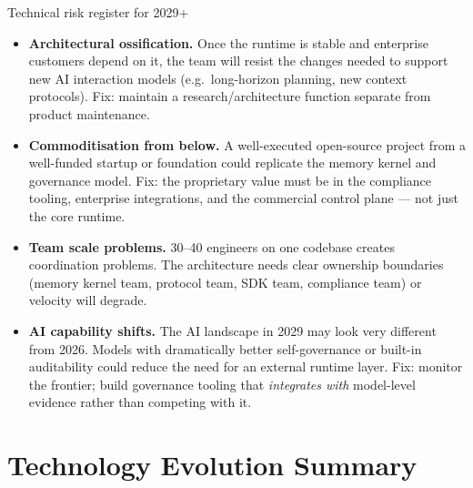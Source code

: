 \begin{warnbox}{Technical risk register for 2029+}
\begin{itemize}[noitemsep,leftmargin=1.4em]
  \item \textbf{Architectural ossification.} Once the runtime is stable and
        enterprise customers depend on it, the team will resist the changes
        needed to support new AI interaction models (e.g.\ long-horizon planning,
        new context protocols). Fix: maintain a research/architecture function
        separate from product maintenance.
  \item \textbf{Commoditisation from below.} A well-executed open-source
        project from a well-funded startup or foundation could replicate the
        memory kernel and governance model. Fix: the proprietary value must be
        in the compliance tooling, enterprise integrations, and the commercial
        control plane — not just the core runtime.
  \item \textbf{Team scale problems.} 30--40 engineers on one codebase creates
        coordination problems. The architecture needs clear ownership
        boundaries (memory kernel team, protocol team, SDK team, compliance
        team) or velocity will degrade.
  \item \textbf{AI capability shifts.} The AI landscape in 2029 may look very
        different from 2026. Models with dramatically better self-governance or
        built-in auditability could reduce the need for an external runtime
        layer. Fix: monitor the frontier; build governance tooling that
        \textit{integrates with} model-level evidence rather than competing
        with it.
\end{itemize}
\end{warnbox}

\section{Technology Evolution Summary}

